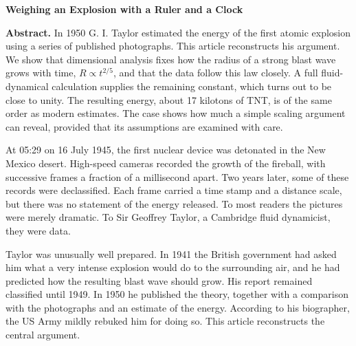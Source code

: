 \documentclass[11pt,a4paper]{article}
\begin{document}
\clearpage
\maintextlayout
\setcounter{lodpara}{0}


{\centering\sffamily\Large\bfseries\color{lodnavy} Weighing an Explosion with a Ruler and a Clock\par}
\vspace{6pt}

\begin{abstractbox}
\small\textbf{Abstract.} In 1950 G. I. Taylor estimated the energy of the first atomic explosion using a series of published photographs. This article reconstructs his argument. We show that dimensional analysis fixes how the radius of a strong blast wave grows with time, $R\propto t^{2/5}$, and that the data follow this law closely. A full fluid-dynamical calculation supplies the remaining constant, which turns out to be close to unity. The resulting energy, about 17 kilotons of TNT, is of the same order as modern estimates. The case shows how much a simple scaling argument can reveal, provided that its assumptions are examined with care.
\end{abstractbox}


\pn At 05:29 on 16 July 1945, the first nuclear device was detonated in the New Mexico desert. High-speed cameras recorded the growth of the fireball, with successive frames a fraction of a millisecond apart. Two years later, some of these records were declassified. Each frame carried a time stamp and a distance scale, but there was no statement of the energy released. To most readers the pictures were merely dramatic. To Sir Geoffrey Taylor, a Cambridge fluid dynamicist, they were data.

\pn Taylor was unusually well prepared. In 1941 the British government had asked him what a very intense explosion would do to the surrounding air, and he had predicted how the resulting blast wave should grow. His report remained classified until 1949. In 1950 he published the theory, together with a comparison with the photographs and an estimate of the energy. According to his biographer, the US Army mildly rebuked him for doing so. This article reconstructs the central argument.

\end{document}
